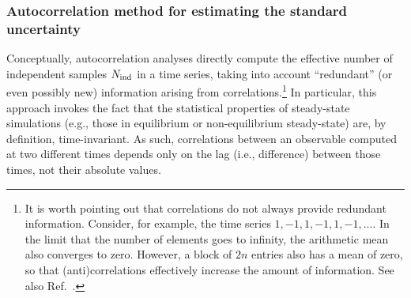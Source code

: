 \subsubsection{Autocorrelation method for estimating the standard uncertainty}\label{sec:autocorrelation}

Conceptually, autocorrelation analyses directly compute the effective number of independent samples $N_{\rm ind}$ in a time series, taking into account ``redundant'' (or even possibly new) information arising from correlations.\footnote{It is worth pointing out that correlations do not always provide redundant information.  Consider, for example, the time series $1,-1,1,-1,1,-1,...$.  In the limit that the number of elements goes to infinity, the arithmetic mean also converges to zero.  However, a block of $2n$ entries also has a mean of zero, so that (anti)correlations effectively increase the amount of information.  See also Ref.~\cite{PatroneAIAA}. }  In particular, this approach invokes the fact that the statistical properties of steady-state simulations (e.g., those in equilibrium or non-equilibrium steady-state) are, by definition, time-invariant.  As such, correlations between an observable computed at two different times depends only on the lag (i.e., difference) between those times, not their absolute values.

